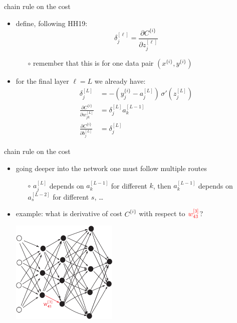 \documentclass[xcolor={svgnames},
               hyperref={colorlinks,citecolor=DeepPink4,linkcolor=FireBrick,urlcolor=Maroon}]
               {beamer}
\begin{document}
\begin{frame}{chain rule on the cost}

\begin{itemize}
\item define, following HH19:
    $$\delta_j^{[\ell]} = \frac{\partial C^{\{i\}}}{\partial z_j^{[\ell]}}$$

    \begin{itemize}
    \item[$\circ$] remember that this is for one data pair $(x^{\{i\}},y^{\{i\}})$
    \end{itemize}
\item for the final layer $\ell=L$ we already have:
\begin{align*}
\delta_j^{[L]} &= - (y_j^{\{i\}} - a_j^{[L]})\, \sigma'(z_j^{[L]}) \\
\frac{\partial C^{\{i\}}}{\partial w_{jk}^{[L]}} &= \delta_j^{[L]} a_k^{[L-1]} \\
\frac{\partial C^{\{i\}}}{\partial b_{j}^{[L]}} &= \delta_j^{[L]}
\end{align*}
\end{itemize}
\end{frame}


\begin{frame}{chain rule on the cost}

\begin{itemize}
\item going deeper into the network one must follow multiple routes
    \begin{itemize}
    \item[$\circ$] $a_j^{[L]}$ depends on $a_k^{[L-1]}$ for different $k$, then $a_k^{[L-1]}$ depends on $a_s^{[L-2]}$ for different $s$, \dots
    \end{itemize}
\item example: \quad what is derivative of cost $C^{\{i\}}$ with respect to \small ${\color{red} w_{43}^{[3]}}$\normalsize?

\begin{center}
\includegraphics[width=0.4\textwidth]{figs/bigredw}
\end{center}
\end{itemize}
\end{frame}
\end{document}
